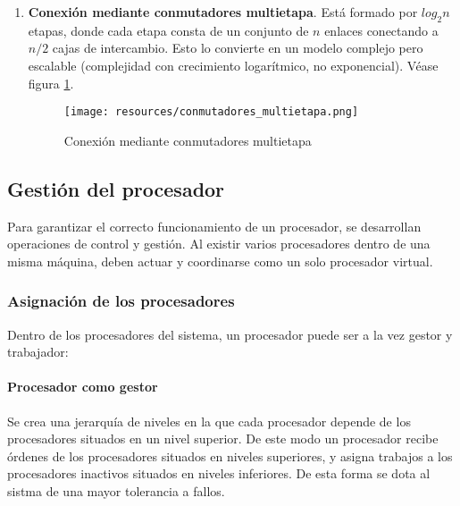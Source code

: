 \documentclass[a4paper, 11pt, titlepage]{article}
\begin{document}
\begin{enumerate}
                \item \textbf{Conexión mediante conmutadores multietapa}. Está formado por $log_2n$ etapas, 
                donde cada etapa consta de un conjunto de $n$ enlaces conectando a $n/2$ cajas de intercambio.
                Esto lo convierte en un modelo complejo pero escalable (complejidad con crecimiento logarítmico, 
                no exponencial). Véase figura \ref{conmutadores_multietapa}.
                
                \begin{figure}[htp]
                    \centering
                    \texttt{[image: resources/conmutadores\_multietapa.png]}
                    \caption{Conexión mediante conmutadores multietapa}
                    \label{conmutadores_multietapa}
                \end{figure}

            \end{enumerate}

    \subsection{Gestión del procesador}

        Para garantizar el correcto funcionamiento de un procesador, se desarrollan operaciones de control y
        gestión. Al existir varios procesadores dentro de una misma máquina, deben actuar y coordinarse como
        un solo procesador virtual.

        \subsubsection{Asignación de los procesadores}

            Dentro de los procesadores del sistema, un procesador puede ser a la vez gestor y trabajador:
            
            \paragraph{Procesador como gestor} Se crea una jerarquía de niveles en la que cada procesador 
            depende de los procesadores situados en un nivel superior. De este modo un procesador recibe 
            órdenes de los procesadores situados en niveles superiores, y asigna trabajos a los 
            procesadores inactivos situados en niveles inferiores. De esta forma se dota al sistma de una 
            mayor tolerancia a fallos.  
\end{document}
